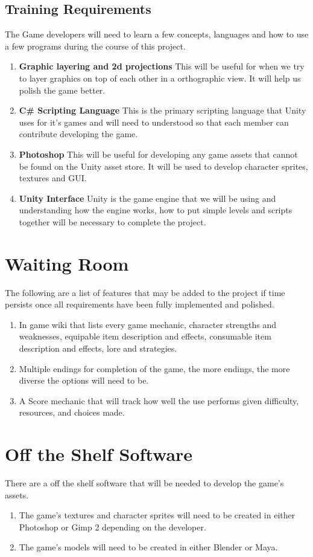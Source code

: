 \documentclass{article}
\begin{document}
\subsection{Training Requirements}
\quad The Game developers will need to learn a few concepts, languages and how to use a few programs during the course of this project.
\begin{enumerate}
	\item \textbf{Graphic layering and 2d projections} This will be useful for when we try to layer graphics on top of each other in a orthographic view. It will help us polish the game better.
	\item \textbf{C\# Scripting Language} This is the primary scripting language that Unity uses for it's games and will need to understood so that each member can contribute developing the game.
	\item \textbf{Photoshop} This will be useful for developing any game assets that cannot be found on the Unity asset store. It will be used to develop character sprites, textures and GUI.
	\item \textbf{Unity Interface} Unity is the game engine that we will be using and understanding how the engine works, how to put simple levels and scripts together will be necessary to complete the project.
\end{enumerate}
\section{Waiting Room}
\quad The following are a list of features that may be added to the project if time persists once all requirements have been fully implemented and polished.
	\begin{enumerate}
	\item In game wiki that lists every game mechanic, character strengths and weaknesses, equipable item description and effects, consumable item description and effects, lore and strategies.
	\item Multiple endings for completion of the game, the more endings, the more diverse the options will need to be.
	\item A Score mechanic that will track how well the use performs given difficulty, resources, and choices made.
	\end{enumerate}
\section{Off the Shelf Software}
\quad There are a off the shelf software that will be needed to develop the game's assets.
\begin{enumerate}[{OSS}1. ]
	\item The game's textures and character sprites will need to be created in either Photoshop or Gimp 2 depending on the developer.
	\item The game's models will need to be created in either Blender or Maya.
\end{enumerate}
\end{document}
